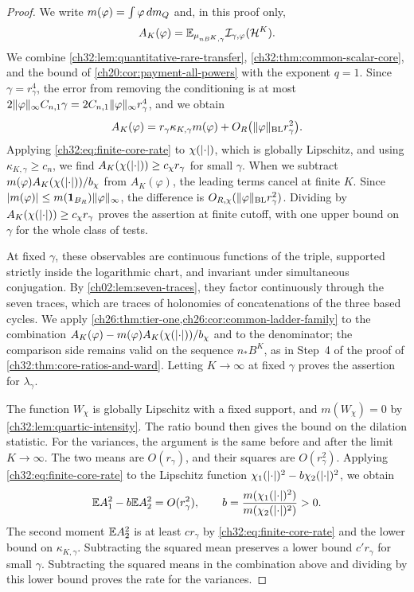 \begin{proof}
We write $m(\varphi)=\int\varphi\,dm_Q$ and, in this proof only,
\[
 A_K(\varphi)=\mathbb E_{\mu_{nB^K,\gamma}}\mathcal I_{\gamma,\varphi}(\mathcal H^K).
\]
We combine \cref{ch32:lem:quantitative-rare-transfer}, \cref{ch32:thm:common-scalar-core}, and the bound of \cref{ch20:cor:payment-all-powers} with the exponent $q=1$. Since $\gamma=r_\gamma^4$, the error from removing the conditioning is at most $2\lVert \varphi\rVert_\infty C_{n,1}\gamma=2C_{n,1}\lVert \varphi\rVert_\infty r_\gamma^4$, and we obtain
\begin{equation}\label{ch32:eq:finite-core-rate}
 A_K(\varphi)=r_\gamma\kappa_{K,\gamma}m(\varphi)+O_R\bigl(\lVert \varphi\rVert_{\mathrm{BL}}r_\gamma^2\bigr).
\end{equation}
Applying \eqref{ch32:eq:finite-core-rate} to $\chi(\lvert \cdot\rvert)$, which is globally Lipschitz, and using $\kappa_{K,\gamma}\ge c_n$, we find $A_K(\chi(\lvert \cdot\rvert))\ge c_\chi r_\gamma$ for small $\gamma$. When we subtract $m(\varphi)A_K(\chi(\lvert \cdot\rvert))/b_\chi$ from $A_K(\varphi)$, the leading terms cancel at finite $K$. Since $\lvert m(\varphi)\rvert\le m(\mathbf 1_{B_R})\lVert \varphi\rVert_\infty$, the difference is $O_{R,\chi}(\lVert \varphi\rVert_{\mathrm{BL}}r_\gamma^2)$. Dividing by $A_K(\chi(\lvert \cdot\rvert))\ge c_\chi r_\gamma$ proves the assertion at finite cutoff, with one upper bound on $\gamma$ for the whole class of tests.

At fixed $\gamma$, these observables are continuous functions of the triple, supported strictly inside the logarithmic chart, and invariant under simultaneous conjugation. By \cref{ch02:lem:seven-traces}, they factor continuously through the seven traces, which are traces of holonomies of concatenations of the three based cycles. We apply \cref{ch26:thm:tier-one,ch26:cor:common-ladder-family} to the combination $A_K(\varphi)-m(\varphi)A_K(\chi(\lvert \cdot\rvert))/b_\chi$ and to the denominator; the comparison side remains valid on the sequence $n_*B^K$, as in Step~4 of the proof of \cref{ch32:thm:core-ratios-and-ward}. Letting $K\to\infty$ at fixed $\gamma$ proves the assertion for $\lambda_\gamma$.

The function $W_\chi$ is globally Lipschitz with a fixed support, and $m(W_\chi)=0$ by \cref{ch32:lem:quartic-intensity}. The ratio bound then gives the bound on the dilation statistic. For the variances, the argument is the same before and after the limit $K\to\infty$. The two means are $O(r_\gamma)$, and their squares are $O(r_\gamma^2)$. Applying \eqref{ch32:eq:finite-core-rate} to the Lipschitz function $\chi_1(\lvert \cdot\rvert)^2-b\chi_2(\lvert \cdot\rvert)^2$, we obtain
\[
 \mathbb E A_1^2-b\mathbb E A_2^2=O(r_\gamma^2),\qquad b=\frac{m(\chi_1(\lvert \cdot\rvert)^2)}{m(\chi_2(\lvert \cdot\rvert)^2)}>0.
\]
The second moment $\mathbb E A_2^2$ is at least $cr_\gamma$ by \eqref{ch32:eq:finite-core-rate} and the lower bound on $\kappa_{K,\gamma}$. Subtracting the squared mean preserves a lower bound $c'r_\gamma$ for small $\gamma$. Subtracting the squared means in the combination above and dividing by this lower bound proves the rate for the variances.
\end{proof}

